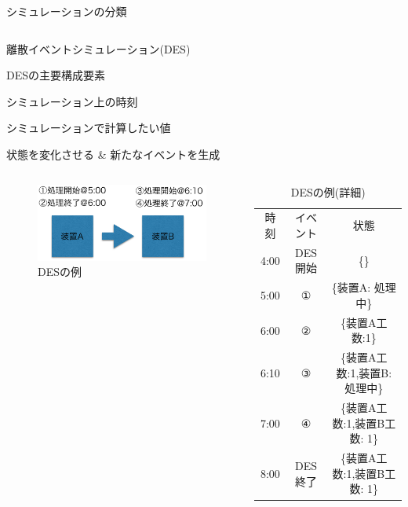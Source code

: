 \documentclass[dvipdfmx,uplatex,11pt]{beamer}
\theoremstyle{definition}
\begin{document}
\begin{frame}{シミュレーションの分類}
\begin{columns}
  \end{columns}
\end{frame}

\begin{frame}{離散イベントシミュレーション(DES)}
  \begin{block}{DESの主要構成要素}
  \begin{description}
      \small
    \item[時刻] シミュレーション上の時刻
    \item[状態] シミュレーションで計算したい値
    \item[イベント] 状態を変化させる \& 新たなイベントを生成
  \end{description}
\end{block}

\begin{columns}
\begin{column}{0.4\textwidth}
 \begin{figure}
   \includegraphics[scale=0.3]{sim.png}
   \caption{DESの例}
  \end{figure}
\end{column}

  \begin{column}{0.6\textwidth}

  \tiny
    \begin{table}
      \caption{DESの例(詳細)}
      \begin{tabular}{ccc}
        時刻 & イベント & 状態\\
        4:00 & DES開始 & \{\}    \\
        5:00 & ① & \{装置A: 処理中\} \\
        6:00 & ② & \{装置A工数:1\} \\
        6:10 & ③ & \{装置A工数:1,装置B: 処理中\} \\
        7:00 & ④& \{装置A工数:1,装置B工数: 1\} \\
        8:00 & DES終了 & \{装置A工数:1,装置B工数: 1\} 
      \end{tabular}
    \end{table}
  \end{column}
\end{columns}

\end{frame}
\end{document}

